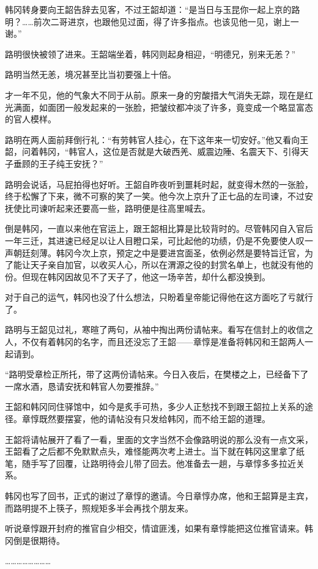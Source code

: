韩冈转身要向王韶告辞去见客，不过王韶却道：“是当日与玉昆你一起上京的路明？……前次二哥进京，也跟他见过面，得了许多指点。也该见他一见，谢上一谢。”

路明很快被领了进来。王韶端坐着，韩冈则起身相迎，“明德兄，别来无恙？”

路明当然无恙，境况甚至比当初要强上十倍。

才一年不见，他的气象大不同于从前。原来一身的穷酸措大气消失无踪，现在是红光满面，如面团一般发起来的一张脸，把皱纹都冲淡了许多，竟变成一个略显富态的官人模样。

路明在两人面前拜倒行礼：“有劳韩官人挂心，在下这年来一切安好。”他又看向王韶，问着韩冈，“韩官人，这位是否就是大破西羌、威震边陲、名震天下、引得天子垂顾的王子纯王安抚？”

路明会说话，马屁拍得也好听。王韶自昨夜听到噩耗时起，就变得木然的一张脸，终于松懈了下来，微不可察的笑了一笑。他今次上京升了正七品的左司谏，不过安抚使比司谏听起来还要高一些，路明便是往高里喊去。

倒是韩冈，一直以来他在官运上，跟王韶相比算是比较背时的。尽管韩冈自入官后一年三迁，其进速已经足以让人目瞪口呆，可比起他的功绩，仍是不免要使人叹一声朝廷刻薄。韩冈今次上京，预定之中是要进宫面圣，依例必然是要特旨迁官，为了能让天子亲自加官，以收买人心，所以在渭源之役的封赏名单上，也就没有他的份。但现在韩冈因故见不了天子了，他这一场辛苦，却什么都没换到。

对于自己的运气，韩冈也没了什么想法，只盼着皇帝能记得他在这方面吃了亏就行了。

路明与王韶见过礼，寒暄了两句，从袖中掏出两份请帖来。看写在信封上的收信之人，不仅有着韩冈的名字，而且还没忘了王韶——章惇是准备将韩冈和王韶两人一起请到。

“路明受章检正所托，带了这两份请帖来。今日入夜后，在樊楼之上，已经备下了一席水酒，恳请安抚和韩官人勿要推辞。”

王韶和韩冈同住驿馆中，如今是炙手可热，多少人正愁找不到跟王韶拉上关系的途径。章惇既然要摆宴，他的请帖没有只发给韩冈，而不给王韶的道理。

王韶将请帖展开了看了一看，里面的文字当然不会像路明说的那么没有一点文采，王韶看了之后都不免默默点头，难怪能两次考上进士。当下就在韩冈这里拿了纸笔，随手写了回覆，让路明待会儿带了回去。他准备去一趟，与章惇多多拉近关系。

韩冈也写了回书，正式的谢过了章惇的邀请。今日章惇办席，他和王韶算是主宾，而路明提不上筷子，照规矩多半会再找个朋友来。

听说章惇跟开封府的推官自少相交，情谊匪浅，如果有章惇能把这位推官请来。韩冈倒是很期待。

……………………

